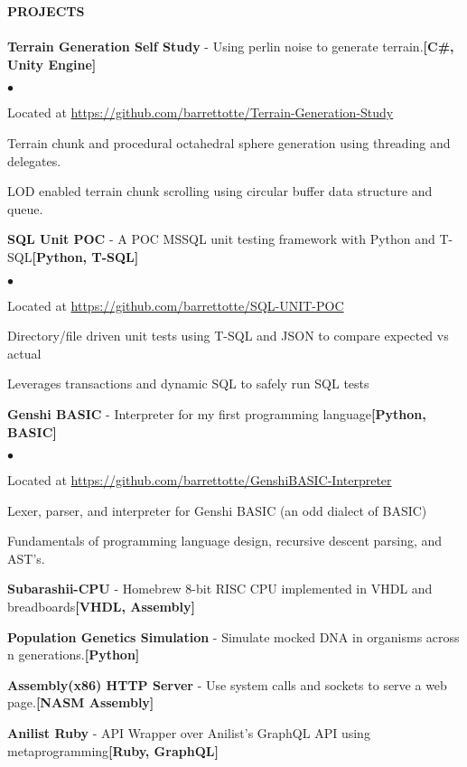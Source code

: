 \documentclass{article}
\newcommand{\lineunder}{
	\vspace*{-4pt}\\ 
	\hspace*{-18pt}\hrulefill \\
}
\newcommand{\header}[1]{
	{\hspace*{-15pt}\vspace*{6pt}\textsc{#1}}\vspace*{-6pt}\lineunder
}
\newcommand{\project}[3]{
	{\textbf{#1} - #2{\hfill\textbf{#3}}\vspace*{3pt}}
}
\newenvironment{resumecontent}{
	\begin{list}
		{\small$\bullet$}{\topsep 0pt \itemsep -2pt}}{\vspace*{4pt}
	\end{list}
}
\newcommand{\resumeheader}[1]{
	\vspace*{5pt}
	\header{\textbf{#1}}
}
\begin{document}
	\resumeheader{PROJECTS}
		\project
			{Terrain Generation Self Study}
			{Using perlin noise to generate terrain.}
			{[C\#, Unity Engine]}
			\begin{resumecontent}
				\item Located at \href{https://github.com/barrettotte/Terrain-Generation-Study}
					{https://github.com/barrettotte/Terrain-Generation-Study}
				\item Terrain chunk and procedural octahedral sphere generation using threading and delegates.
				\item LOD enabled terrain chunk scrolling using circular buffer data structure and queue. 
			\end{resumecontent}
		\project
			{SQL Unit POC}
			{A POC MSSQL unit testing framework with Python and T-SQL} 
			{[Python, T-SQL]}
			\begin{resumecontent}
				\item Located at \href{https://github.com/barrettotte/SQL-UNIT-POC}
					{https://github.com/barrettotte/SQL-UNIT-POC}
				\item Directory/file driven unit tests using T-SQL and JSON to compare expected vs actual
				\item Leverages transactions and dynamic SQL to safely run SQL tests
			\end{resumecontent}
		\project
			{Genshi BASIC}
			{Interpreter for my first programming language}
			{[Python, BASIC]}
			\begin{resumecontent}
				\item Located at \href{https://github.com/barrettotte/GenshiBASIC-Interpreter}
					{https://github.com/barrettotte/GenshiBASIC-Interpreter}
				\item Lexer, parser, and interpreter for Genshi BASIC (an odd dialect of BASIC)
				\item Fundamentals of programming language design, recursive descent parsing, and AST's.
			\end{resumecontent}
		\project
			{Subarashii-CPU}
			{Homebrew 8-bit RISC CPU implemented in VHDL and breadboards} 
			{[VHDL, Assembly]}
		\project
			{Population Genetics Simulation}
			{Simulate mocked DNA in organisms across n generations.}
			{[Python]}
		\project
			{Assembly(x86) HTTP Server}
			{Use system calls and sockets to serve a web page.}
			{[NASM Assembly]}
		\project
			{Anilist Ruby}
			{API Wrapper over Anilist's GraphQL API using metaprogramming}
			{[Ruby, GraphQL]}
\end{document}
